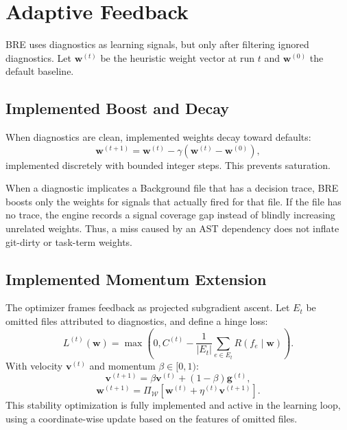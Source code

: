 \documentclass[11pt,onecolumn]{article}
\begin{document}
\section{Adaptive Feedback}
BRE uses diagnostics as learning signals, but only after filtering ignored diagnostics. Let $\mathbf{w}^{(t)}$ be the heuristic weight vector at run $t$ and $\mathbf{w}^{(0)}$ the default baseline.

\subsection{Implemented Boost and Decay}
When diagnostics are clean, implemented weights decay toward defaults:
\begin{equation}
\mathbf{w}^{(t+1)} =
\mathbf{w}^{(t)} - \gamma(\mathbf{w}^{(t)}-\mathbf{w}^{(0)}),
\end{equation}
implemented discretely with bounded integer steps. This prevents saturation.

When a diagnostic implicates a Background file that has a decision trace, BRE boosts only the weights for signals that actually fired for that file. If the file has no trace, the engine records a signal coverage gap instead of blindly increasing unrelated weights. Thus, a miss caused by an AST dependency does not inflate git-dirty or task-term weights.

\subsection{Implemented Momentum Extension}
The optimizer frames feedback as projected subgradient ascent. Let $E_t$ be omitted files attributed to diagnostics, and define a hinge loss:
\begin{equation}
L^{(t)}(\mathbf{w}) =
\max\left(0, C^{(t)} -
\frac{1}{|E_t|}\sum_{e\in E_t} R(f_e \mid \mathbf{w})\right).
\end{equation}
With velocity $\mathbf{v}^{(t)}$ and momentum $\beta \in [0,1)$:
\begin{equation}
\mathbf{v}^{(t+1)} = \beta \mathbf{v}^{(t)} + (1-\beta)\mathbf{g}^{(t)},
\end{equation}
\begin{equation}
\mathbf{w}^{(t+1)} =
\Pi_{\mathcal{W}}\left[\mathbf{w}^{(t)}+\eta^{(t)}\mathbf{v}^{(t+1)}\right].
\end{equation}
This stability optimization is fully implemented and active in the learning loop, using a coordinate-wise update based on the features of omitted files.
\end{document}
